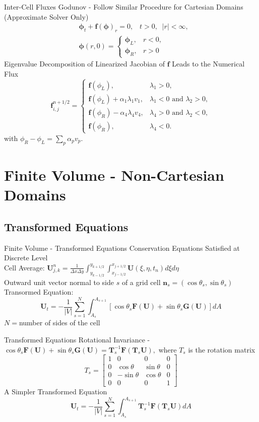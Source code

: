 \documentclass{beamer}
\newcommand{\mbf}{\mathbf}
\newcommand{\bq}{\begin{equation}}
\newcommand{\eq}{\end{equation}}
\begin{document}
\begin{frame}{Inter-Cell Fluxes}
Godunov - Follow Similar Procedure for Cartesian Domains (Approximate Solver Only)
\bq \begin{split}
&\mbf{\phi}_t+\mbf{f}(\mbf{\phi})_r=0,\;\;\; t>0,\;\; |r|<\infty,\\
&\mbf{\phi}(r,0)=\left\{\begin{array}{cc}\mbf{\phi}_L,&r<0,\\ \mbf{\phi}_R,&r>0\end{array}\right.
\end{split}\eq
Eigenvalue Decomposition of Linearized Jacobian of $\mbf{f}$ Leads to the Numerical Flux
\bq \mbf{f}_{i,j}^{n+1/2}=\left\{\begin{array}{cc}\mbf{f}(\phi_L),&\lambda_1>0,\\
\mbf{f}(\phi_L)+\alpha_1\lambda_1v_1,&\lambda_1<0\text{ and }\lambda_2>0,\\
\mbf{f}(\phi_R)-\alpha_4\lambda_4 v_4,&\lambda_4>0\text{ and }\lambda_2<0,\\
\mbf{f}(\phi_R),&\lambda_4<0.\end{array}\right.\eq
with $\phi_R-\phi_L=\sum_p \alpha_p v_p.$

\end{frame}

\section{Finite Volume - Non-Cartesian Domains}
\subsection{Transformed Equations}
\begin{frame}{Finite Volume - Transformed Equations}
Conservation Equations Satisfied at Discrete Level\\
Cell Average: $\mbf{U}_{j,k}^n=\frac{1}{\Delta x \Delta y}\int_{y_{k-1/2}}^{y_{k+1/2}}\int_{x_{j-1/2}}^{x_{j+1/2}}\mbf{U}(\xi,\eta,t_n)d\xi d\eta$\\
Outward unit vector normal to side $s$ of a grid cell $\mbf{n}_s=(\cos\theta_s,\sin\theta_s)$
Transormed Equation:
\bq \mbf{U}_t=-\frac{1}{|V|}\sum_{s=1}^N\int_{A_s}^{A_{s+1}}[\cos\theta_s\mbf{F}(\mbf{U})+\sin\theta_s\mbf{G}(\mbf{U})]dA\eq
$N=$number of sides of the cell
\end{frame}


\begin{frame}{Transformed Equations}
Rotational Invariance - $\cos\theta_s\mbf{F}(\mbf{U})+\sin\theta_s\mbf{G}(\mbf{U})=\mbf{T}_s^{-1}\mbf{F}(\mbf{T}_s\mbf{U}),$
where $T_s$ is the rotation matrix
$$T_s=\left[\begin{array}{cccc}1&0&0&0\\ 0&\cos\theta&\sin\theta&0\\ 0&-\sin\theta&\cos\theta&0\\ 0&0&0&1\end{array}\right]$$
A Simpler Transformed Equation
\bq \mbf{U}_t=-\frac{1}{|V|}\sum_{s=1}^N\int_{A_s}^{A_{s+1}}\mbf{T}_s^{-1}\mbf{F}(\mbf{T}_s\mbf{U})dA\eq
\end{frame}
\end{document}
